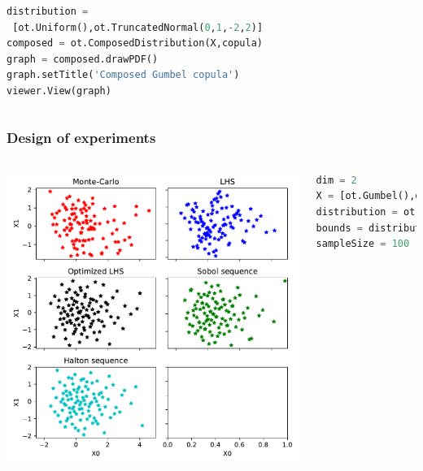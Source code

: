 \documentclass[aspectratio=169]{beamer}
\begin{document}
\begin{frame}[containsverbatim]
\begin{columns}
\tiny
\begin{lstlisting}[language=Python, numbers = none]
distribution =
 [ot.Uniform(),ot.TruncatedNormal(0,1,-2,2)]
composed = ot.ComposedDistribution(X,copula)
graph = composed.drawPDF()
graph.setTitle('Composed Gumbel copula')
viewer.View(graph)
\end{lstlisting}




\end{columns}


\end{frame}


\begin{frame}[containsverbatim]
\frametitle{Design of experiments}

\scriptsize{

\begin{columns}

    \includegraphics[width=1.\textwidth]{figures/DOE.pdf}

    
\tiny

\begin{lstlisting}[language=Python, numbers = none]
dim = 2
X = [ot.Gumbel(),ot.TruncatedNormal(0,1,-2,2)]
distribution = ot.ComposedDistribution(X)
bounds = distribution.getRange()
sampleSize = 100


\end{lstlisting}
\end{columns}}
\end{frame}
\end{document}
